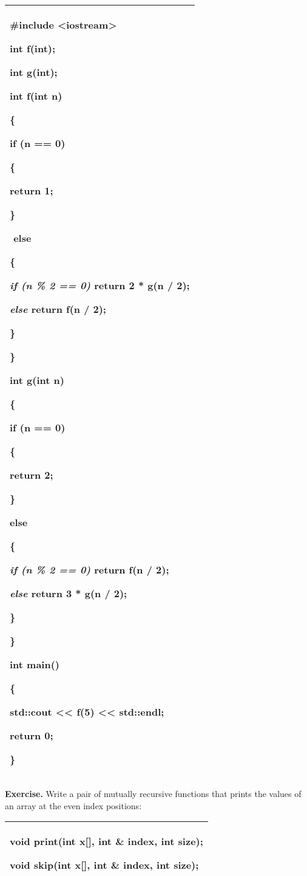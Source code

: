 \documentclass[
]{article}
\begin{document}
\begin{longtable}[]{@{}l@{}}
\toprule
\endhead
\begin{minipage}[t]{0.97\columnwidth}\raggedright
\#include \textless iostream\textgreater{}

int f(int);

int g(int);

int f(int n)

\{

if (n == 0)

\{

return 1;

\}

­ else

\{

\emph{ if (n \% 2 == 0) }return 2 * g(n / 2);

\emph{ else }return f(n / 2);

\}

\}

int g(int n)

\{

if (n == 0)

\{

return 2;

\}

else

\{

\emph{ if (n \% 2 == 0) }return f(n / 2);

\emph{ else }return 3 * g(n / 2);

\}

\}

int main()

\{

std::cout \textless\textless{} f(5) \textless\textless{} std::endl;

return 0;

\}\strut
\end{minipage}\tabularnewline
\bottomrule
\end{longtable}

\textbf{Exercise.} Write a pair of mutually recursive functions that
prints the values of an array at the even index positions:

\begin{longtable}[]{@{}l@{}}
\toprule
\endhead
\begin{minipage}[t]{0.97\columnwidth}\raggedright
void print(int x{[}{]}, int \& index, int size);

void skip(int x{[}{]}, int \& index, int size);\strut
\end{minipage}\tabularnewline
\bottomrule
\end{longtable}
\end{document}
